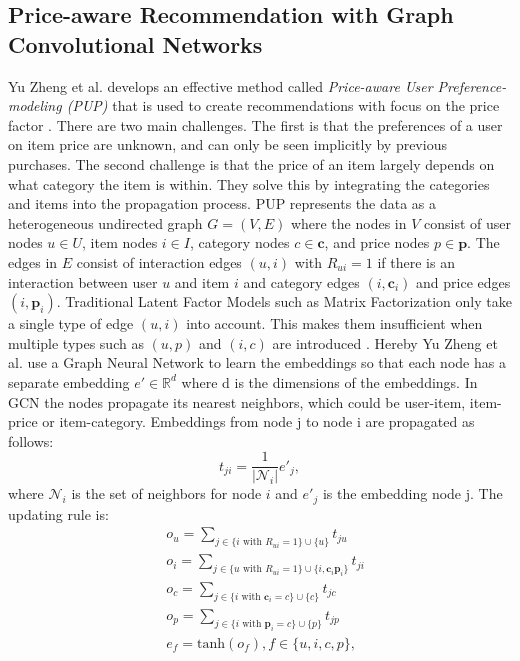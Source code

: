 \subsection{Price-aware Recommendation with Graph Convolutional Networks}
Yu Zheng et al. develops an effective method called \textit{Price-aware User Preference-modeling (PUP)} that is used to create recommendations with focus on the price factor \cite{Priceaware}.
There are two main challenges. 
The first is that the preferences of a user on item price are unknown, and can only be seen implicitly by previous purchases.
The second challenge is that the price of an item largely depends on what category the item is within.
They solve this by integrating the categories and items into the propagation process.
PUP represents the data as a heterogeneous undirected graph $G = (V,E)$ where the nodes in $V$ consist of user nodes $u \in U$, item nodes $i \in I$, category nodes $c \in \textbf{c}$, and price nodes $p \in \textbf{p}$.
The edges in $E$ consist of interaction edges $(u, i)$ with $R_{ui} = 1$ if there is an interaction between user $u$ and item $i$ and category edges $(i, \textbf{c}_i)$ and price edges $(i, \textbf{p}_i)$.
Traditional Latent Factor Models such as Matrix Factorization only take a single type of edge $(u, i)$ into account. 
This makes them insufficient when multiple types such as $(u, p)$ and $(i, c)$ are introduced \cite{Priceaware}.
Hereby Yu Zheng et al. use a Graph Neural Network to learn the embeddings so that each node has a separate embedding $e' \in \mathbb{R}^d$ where d is the dimensions of the embeddings.
In GCN the nodes propagate its nearest neighbors, which could be user-item, item-price or item-category.
Embeddings from node j to node i are propagated as follows:
\begin{equation}
    t_{ji} = \frac{1}{|\mathcal{N}_i|}e'_j,
\end{equation}
where $\mathcal{N}_i$ is the set of neighbors for node $i$ and $e'_j$ is the embedding node j.
The updating rule is:
\begin{align*}
     & o_u = \sum_{j \in \{i \textrm{ with } R_{ui}=1 \} \cup \{ u\}}^{} t_{ju}                            \\
     & o_i = \sum_{j \in \{u \textrm{ with } R_{ui}=1 \} \cup \{ i, \textbf{c}_i \textbf{p}_i\}}^{} t_{ji} \\
     & o_c = \sum_{j \in \{i \textrm{ with } \textbf{c}_i=c \} \cup \{ c\}}^{} t_{jc}                      \\
     & o_p = \sum_{j \in \{i \textrm{ with } \textbf{p}_i=c \} \cup \{ p\}}^{} t_{jp}                      \\
     & e_f = \textrm{tanh}(o_f), f \in \{u, i, c, p\},
\end{align*}
